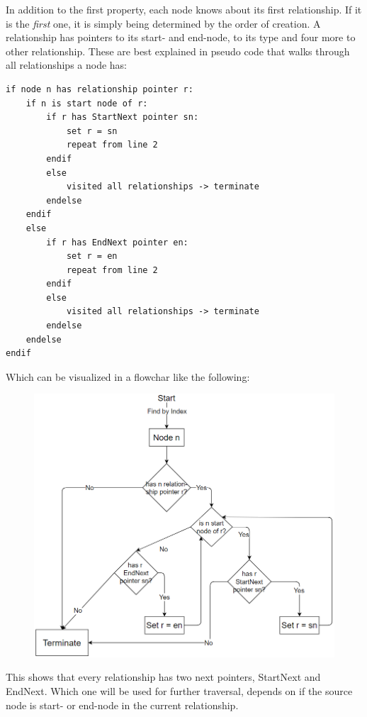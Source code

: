 In addition to the first property, each node knows about its first relationship. If it is the \emph{first} one, it is simply being determined by the order of creation. A relationship has pointers to its start- and end-node, to its type and four more to other relationship.\cite{NeoInternals} These are best explained in pseudo code that walks through all relationships a node has:
\newpage
\lstset{language=JavaScript}
\begin{lstlisting}[caption={Algorithm to Demonstrate Next Pointers},label={ex:NeoPointers}]
if node n has relationship pointer r: 
	if n is start node of r: 
		if r has StartNext pointer sn: 
			set r = sn 
			repeat from line 2 
		endif 
		else  
			visited all relationships -> terminate
		endelse 
	endif 
	else 
		if r has EndNext pointer en: 
			set r = en 
			repeat from line 2 
		endif 
		else
			visited all relationships -> terminate
		endelse 
	endelse 
endif
\end{lstlisting}

Which can be visualized in a flowchar like the following:
\begin{figure}[H]
\centering
\includegraphics[scale=.6]{Bilder/NeoAlgoExplanation.png}
\label{pic:NeoAlgoExplanation}
\end{figure}

This shows that every relationship has two next pointers, StartNext and EndNext. Which one will be used for further traversal, depends on if the source node is start- or end-node in the current relationship. \cite{NeoInternals}

